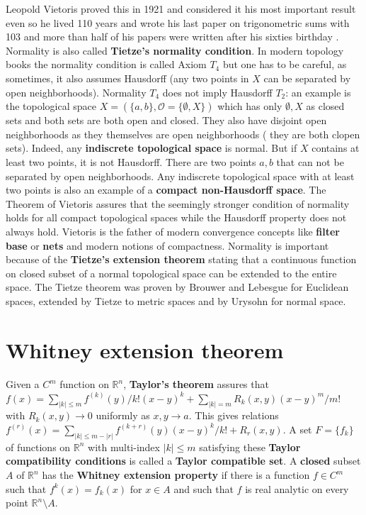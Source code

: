 \documentclass[12pt]{amsart}
\newcounter{example}    \def\example#1{ \item \fontsize{12}{15} \selectfont #1 \fontsize{12}{15} \selectfont }
\begin{document}
Leopold Vietoris proved this in 1921 and considered it his most important result
even so he lived 110 years and wrote his last paper on trigonometric sums with 103
and more than half of his papers were written after his sixties birthday
\cite{Reitberger2002}. Normality is also called {\bf Tietze's normality
condition}. In modern topology books the normality condition is called Axiom $T_4$
but one has to be careful, as sometimes, it also assumes Hausdorff (any two points in $X$
can be separated by open neighborhoods). Normality $T_4$ does not imply Hausdorff $T_2$: an example is
the topological space $X=(\{a,b\}, \mathcal{O}=\{ \emptyset,X \})$ which has only $\emptyset,X$ 
as closed sets and both sets are both open and closed. They
also have disjoint open neighborhoods as they themselves are open neighborhoods (
they are both clopen sets). Indeed, any {\bf indiscrete topological space} is normal. 
But if $X$ contains at least two points, it is not Hausdorff. There are two points $a,b$ 
that can not be separated by open neighborhoods. 
Any indiscrete topological space with at least two points 
is also an example of a {\bf compact non-Hausdorff space}. 
The Theorem of Vietoris assures that the seemingly stronger condition
of normality holds for all compact topological spaces while the Hausdorff property does not
always hold. Vietoris is the father of modern convergence concepts like {\bf filter base} or 
{\bf nets} and modern notions of compactness.
Normality is important because of the {\bf Tietze's extension theorem} stating that a
continuous function on closed subset of a normal topological space can be extended to the
entire space. The Tietze theorem was proven by Brouwer and Lebesgue for Euclidean spaces,
extended by Tietze to metric spaces and by Urysohn for normal space.


\section{Whitney extension theorem}

\paragraph{}
Given a $C^m$ function on $\mathbb{R}^n$, {\bf Taylor's theorem} assures that
$f(x) = \sum_{|k| \leq m} f^{(k)}(y)/k! (x-y)^k + \sum_{|k|=m} R_k(x,y) (x-y)^m/m!$ with $R_k(x,y) \to 0$
uniformly as $x,y \to a$. 
This gives relations $f^{(r)}(x) = \sum_{|k| \leq m-|r|} f^{(k+r)}(y) (x-y)^k/k! + R_r(x,y)$. 
A set $F=\{ f_k\}$ of functions on $\mathbb{R}^n$ 
with multi-index $|k| \leq m$ satisfying these {\bf Taylor compatibility conditions} is called a {\bf Taylor compatible set}. 
A {\bf closed} subset $A$ of $\mathbb{R}^n$ has the {\bf Whitney extension property} if there is a function 
$f \in C^m$ such that $f^{k}(x)=f_k(x)$ for $x \in A$ 
and such that $f$ is real analytic on every point $\mathbb{R}^n \setminus A$. 
\end{document}
